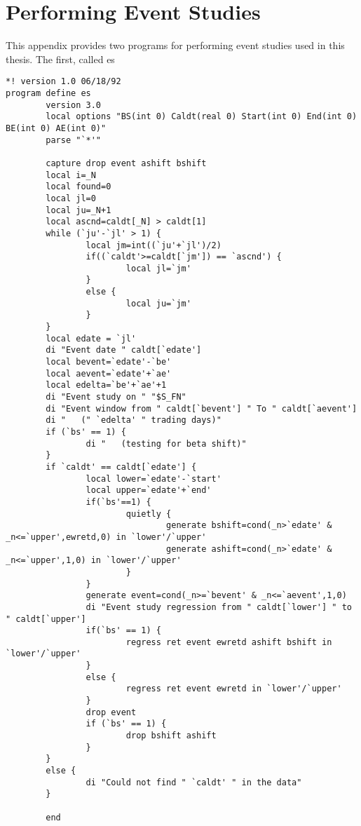 \appendix
\chapter{Performing Event Studies}

This appendix provides two programs for performing event
studies used in this thesis.  The first, called es

\begin{singlespace}
\begin{scriptsize}
\begin{verbatim}
*! version 1.0 06/18/92
program define es
        version 3.0
        local options "BS(int 0) Caldt(real 0) Start(int 0) End(int 0) BE(int 0) AE(int 0)"
        parse "`*'"
        
        capture drop event ashift bshift
        local i=_N
        local found=0
        local jl=0
        local ju=_N+1
        local ascnd=caldt[_N] > caldt[1]
        while (`ju'-`jl' > 1) {
                local jm=int((`ju'+`jl')/2)
                if((`caldt'>=caldt[`jm']) == `ascnd') {
                        local jl=`jm'
                }
                else {
                        local ju=`jm'
                }
        }
        local edate = `jl'
        di "Event date " caldt[`edate']
        local bevent=`edate'-`be'
        local aevent=`edate'+`ae'
        local edelta=`be'+`ae'+1
        di "Event study on " "$S_FN"
        di "Event window from " caldt[`bevent'] " To " caldt[`aevent']
        di "   (" `edelta' " trading days)"
        if (`bs' == 1) {
                di "   (testing for beta shift)"
        }
        if `caldt' == caldt[`edate'] {
                local lower=`edate'-`start'
                local upper=`edate'+`end'
                if(`bs'==1) {
                        quietly {
                                generate bshift=cond(_n>`edate' & _n<=`upper',ewretd,0) in `lower'/`upper'
                                generate ashift=cond(_n>`edate' & _n<=`upper',1,0) in `lower'/`upper'
                        }
                }
                generate event=cond(_n>=`bevent' & _n<=`aevent',1,0)
                di "Event study regression from " caldt[`lower'] " to " caldt[`upper']
                if(`bs' == 1) {
                        regress ret event ewretd ashift bshift in `lower'/`upper'
                }
                else {
                        regress ret event ewretd in `lower'/`upper'
                }
                drop event
                if (`bs' == 1) {
                        drop bshift ashift
                }
        }
        else {
                di "Could not find " `caldt' " in the data"
        }
     
        end
\end{verbatim}
\end{scriptsize}
\end{singlespace}

